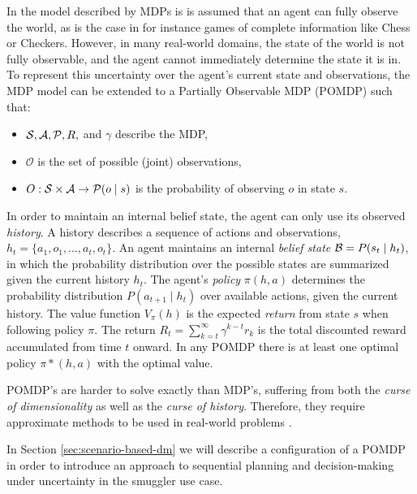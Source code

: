 \documentclass[conference]{IEEEtran}
\begin{document}
In the model described by MDPs is is assumed that an agent can fully observe the world, as is the case in for instance games of complete information like Chess or Checkers. However, in many real-world domains, the state of the world is not fully observable, and the agent cannot immediately determine the state it is in. To represent this uncertainty over the agent's current state and observations, the MDP model can be extended to a Partially Observable MDP (POMDP) \cite{aastrom1965optimal,pomdp} such that: 

\begin{itemize}
\item $\S,\mathcal{A},\P,R,$ and $\gamma$ describe the MDP,
\item $\mathcal{O}$ is the set of possible (joint) observations,
\item $O:\S\times\mathcal{A}\to\P(o\mid s)$ is the probability of observing $o$ in state $s$. 
\end{itemize}

In order to maintain an internal belief state, the agent can only use its observed \emph{history}. A history describes a sequence of actions and observations, $h_t = \{a_1, o_1, \ldots, a_t, o_t\}$. An agent maintains an internal {\it belief state} $\B = P(s_t\mid  h_t)$, in which the probability distribution over the possible states are summarized given the current history $h_t$. The agent's \emph{policy} $\pi(h,a)$ determines the probability distribution $P(a_{t+1}\mid h_t)$ over available actions, given the current history. The value function $V_{\pi}(h)$ is the expected {\it return} from state $s$ when following policy $\pi$. The return $R_t = \sum\nolimits_{k=t}^{\infty} \gamma^{k−t}r_k$ is the total discounted reward accumulated from time $t$ onward. In any POMDP there is at least one optimal policy $\pi*(h, a)$ with the optimal value.

POMDP's are harder to solve exactly than MDP's, suffering from both the {\it curse of dimensionality} as well as the {\it curse of history}. Therefore, they require approximate methods to be used in real-world problems \cite{pineau2006anytime}.

In Section \ref{sec:scenario-based-dm} we will describe a configuration of a POMDP in order to introduce an approach to sequential planning and decision-making under uncertainty in the smuggler use case. 

\end{document}
